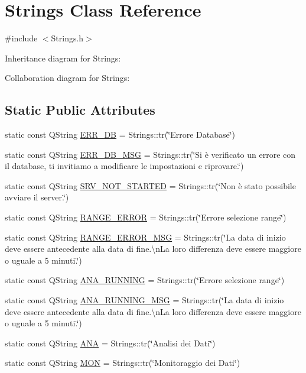 \hypertarget{class_strings}{}\section{Strings Class Reference}
\label{class_strings}


{\ttfamily \#include $<$Strings.\+h$>$}



Inheritance diagram for Strings\+:


Collaboration diagram for Strings\+:
\subsection*{Static Public Attributes}
\begin{DoxyCompactItemize}
\item 
static const Q\+String \hyperlink{class_strings_af7f3a97cfb8e6cdf66fe91d897e9d1f8}{E\+R\+R\+\_\+\+DB} = Strings\+::tr(\char`\"{}Errore Database\char`\"{})
\item 
static const Q\+String \hyperlink{class_strings_aa85338ecfc356a2c50e930405e61f900}{E\+R\+R\+\_\+\+D\+B\+\_\+\+M\+SG} = Strings\+::tr(\char`\"{}Si è verificato un errore con il database, ti invitiamo a modificare le impostazioni e riprovare.\char`\"{})
\item 
static const Q\+String \hyperlink{class_strings_a17e0c187646157ce7a83194fdab54d39}{S\+R\+V\+\_\+\+N\+O\+T\+\_\+\+S\+T\+A\+R\+T\+ED} = Strings\+::tr(\char`\"{}Non è stato possibile avviare il server.\char`\"{})
\item 
static const Q\+String \hyperlink{class_strings_a68a66a01c7abac6a1d564663f96bf882}{R\+A\+N\+G\+E\+\_\+\+E\+R\+R\+OR} = Strings\+::tr(\char`\"{}Errore selezione range\char`\"{})
\item 
static const Q\+String \hyperlink{class_strings_a314de68dc2eaf06f2a61f82ed6208be2}{R\+A\+N\+G\+E\+\_\+\+E\+R\+R\+O\+R\+\_\+\+M\+SG} = Strings\+::tr(\char`\"{}La data di inizio deve essere antecedente alla data di fine.\textbackslash{}n\+La loro differenza deve essere maggiore o uguale a 5 minuti.\char`\"{})
\item 
static const Q\+String \hyperlink{class_strings_acf03fc4cedf332babb378f6745735399}{A\+N\+A\+\_\+\+R\+U\+N\+N\+I\+NG} = Strings\+::tr(\char`\"{}Errore selezione range\char`\"{})
\item 
static const Q\+String \hyperlink{class_strings_a9dcdf53029ed4318fb2aa47bd71611ea}{A\+N\+A\+\_\+\+R\+U\+N\+N\+I\+N\+G\+\_\+\+M\+SG} = Strings\+::tr(\char`\"{}La data di inizio deve essere antecedente alla data di fine.\textbackslash{}n\+La loro differenza deve essere maggiore o uguale a 5 minuti.\char`\"{})
\item 
static const Q\+String \hyperlink{class_strings_a5b3c4480aa7f534900f712f96e4c2174}{A\+NA} = Strings\+::tr(\char`\"{}Analisi dei Dati\char`\"{})
\item 
static const Q\+String \hyperlink{class_strings_a756021250a6391893651f0ed67b16dc9}{M\+ON} = Strings\+::tr(\char`\"{}Monitoraggio dei Dati\char`\"{})
\end{DoxyCompactItemize}


